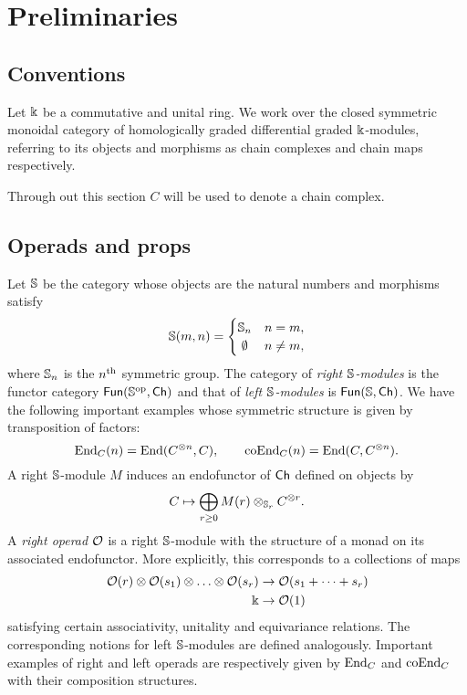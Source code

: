 
\section{Preliminaries} \label{s:preliminaries}

\subsection{Conventions}

Let $\Bbbk$ be a commutative and unital ring.
We work over the closed symmetric monoidal category of homologically graded differential graded $\Bbbk$-modules, referring to its objects and morphisms as chain complexes and chain maps respectively.

Through out this section $C$ will be used to denote a chain complex.

\subsection{Operads and props}

Let $\mathbb{S}$ be the category whose objects are the natural numbers and morphisms satisfy
\[
\Sym(m,n) = \begin{cases}
\Sym_n & n = m, \\
\hfil \emptyset & n \neq m,
\end{cases}
\]
where $\mathbb{S}_n$ is the $n^{\mathrm{th}}$ symmetric group.
The category of \textit{right $\mathbb{S}$-modules} is the functor category $\mathsf{Fun}(\mathbb{S}^{\mathrm{op}}, \mathsf{Ch})$ and that of \textit{left $\mathbb{S}$-modules} is $\mathsf{Fun}(\mathbb{S}, \mathsf{Ch})$.
We have the following important examples whose symmetric structure is given by transposition of factors:
\begin{equation} \label{e:endo and coendo operads}
\mathrm{End}_C(n) = \mathrm{End}(C^{\otimes n}, C), \qquad
\mathrm{coEnd}_C(n) = \mathrm{End}(C, C^{\otimes n}).
\end{equation}
A right $\mathbb{S}$-module $M$ induces an endofunctor of $\mathsf{Ch}$ defined on objects by
\[
C \mapsto \bigoplus_{r \geq 0} M(r) \otimes_{\mathbb{S}_r} C^{\otimes r}.
\]
A \textit{right operad} $\mathcal{O}$ is a right $\mathbb{S}$-module with the structure of a monad on its associated endofunctor.
More explicitly, this corresponds to a collections of maps
\[
\begin{split}
\cO(r) \ot \cO(s_1) \ot \dots \ot \cO(s_r) & \to \cO(s_1 + \dots + s_r) \\
\k & \to \cO(1)
\end{split}
\]
satisfying certain associativity, unitality and equivariance relations.
The corresponding notions for left $\mathbb{S}$-modules are defined analogously.
Important examples of right and left operads are respectively given by $\mathrm{End}_C$ and $\mathrm{coEnd}_C$ with their composition structures.

